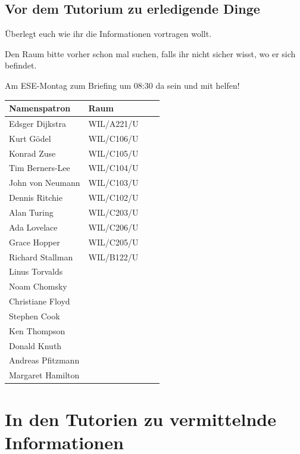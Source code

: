 \documentclass[a4paper,12pt]{report}
\begin{document}
\section{Vor dem Tutorium zu erledigende Dinge}
\begin{itemize*}
\item Überlegt euch wie ihr die Informationen vortragen wollt.
\item Den Raum bitte vorher schon mal suchen, falls ihr nicht sicher wisst, wo er sich befindet.
\item Am ESE-Montag zum Briefing um 08:30 da sein und mit helfen!
\end{itemize*}

\begin{center}
\vspace{1cm}
\begin{tabular}[h]{|l|l|l|l|}
	\hline
	\textbf{Namenspatron}		& \textbf{Raum}\\ \hline
	Edsger Dijkstra				& WIL/A221/U\\
	Kurt Gödel					& WIL/C106/U\\
	Konrad Zuse					& WIL/C105/U\\
	Tim Berners-Lee				& WIL/C104/U\\
	John von Neumann			& WIL/C103/U\\
	Dennis Ritchie				& WIL/C102/U\\
	Alan Turing 				& WIL/C203/U\\
	Ada Lovelace				& WIL/C206/U\\
	Grace Hopper				& WIL/C205/U\\
	Richard Stallman			& WIL/B122/U\\
	Linus Torvalds				&\\
	Noam Chomsky				&\\
	Christiane Floyd			&\\
	Stephen Cook				&\\
	Ken Thompson				&\\
	Donald Knuth				&\\
	Andreas Pfitzmann			&\\
	Margaret Hamilton			&\\
	\hline
\end{tabular}
\end{center}

\chapter{In den Tutorien zu vermittelnde Informationen}
\end{document}
